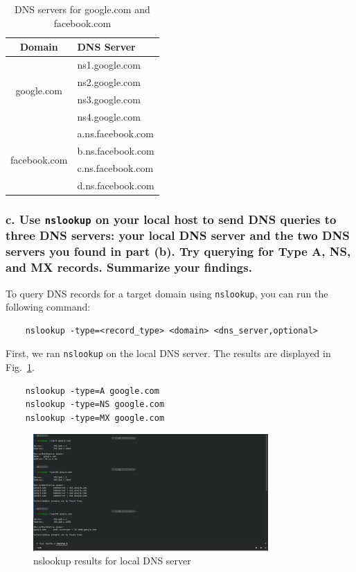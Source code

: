 \documentclass{cshwk}
\begin{document}
\begin{table}[htbp]
    \centering
    \begin{tabular}{cl}
        \hline
        Domain                        & DNS Server        \\
        \hline
        \multirow{4}{*}{google.com}   & ns1.google.com    \\
                                      & ns2.google.com    \\
                                      & ns3.google.com    \\
                                      & ns4.google.com    \\
        \hline
        \multirow{4}{*}{facebook.com} & a.ns.facebook.com \\
                                      & b.ns.facebook.com \\
                                      & c.ns.facebook.com \\
                                      & d.ns.facebook.com \\
        \hline
    \end{tabular}
    \caption{DNS servers for google.com and facebook.com}
    \label{tab:whois-icann}
\end{table}
\subsubsection*{c. Use \texttt{nslookup} on your local host to send DNS queries to three DNS servers: your local DNS server and the two DNS servers you found in part (b). Try querying for Type A, NS, and MX records. Summarize your findings.}

To query DNS records for a target domain using \texttt{nslookup}, you can run the following command:

\begin{verbatim}
    nslookup -type=<record_type> <domain> <dns_server,optional>
\end{verbatim}

First, we ran \texttt{nslookup} on the local DNS server. The results are displayed in Fig.~\ref{fig:nslookup-local}.

\begin{lstlisting}
    nslookup -type=A google.com
    nslookup -type=NS google.com
    nslookup -type=MX google.com
\end{lstlisting}

\begin{figure}[htbp]
    \centering
    \includegraphics[width=0.8\textwidth]{hw2-1-3.png}
    \caption{nslookup results for local DNS server}
    \label{fig:nslookup-local}
\end{figure}
\end{document}
